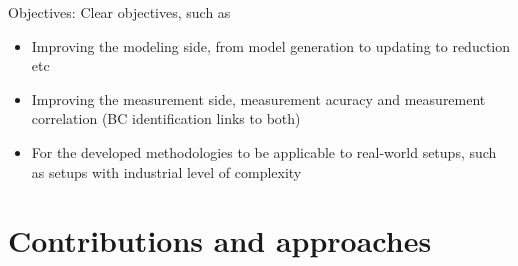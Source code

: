 Objectives:
Clear objectives, such as
\begin{itemize}
  \item Improving the modeling side, from model generation to updating to reduction etc
  \item Improving the measurement side, measurement acuracy and measurement correlation (BC identification links to both)
  \item For the developed methodologies to be applicable to real-world setups, such as setups with industrial level of complexity
\end{itemize}

\section{Contributions and approaches}

